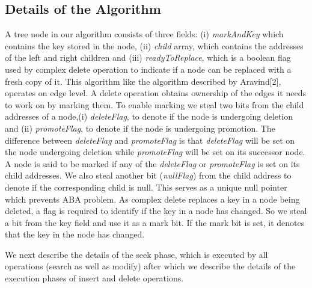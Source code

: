 \documentclass[11pt]{article}
\begin{document}
\begin{multicols}{2}
\subsection{Details of the Algorithm}
A tree node in our algorithm consists of three fields: (i) \textit{markAndKey} which contains the key stored in the node, (ii) \textit{child} array, which contains the addresses of the left and right children and (iii) \textit{readyToReplace}, which is a boolean flag used by complex delete operation to indicate if a node can be replaced with a fresh copy of it.
This algorithm like the algorithm described by Aravind[2], operates on edge level. A delete operation obtains ownership of the edges it needs to work on by marking them. To enable marking we steal two bits from the child addresses of a node,(i) \textit{deleteFlag}, to denote if the node is undergoing deletion and (ii) \textit{promoteFlag}, to denote if the node is undergoing promotion. The difference between \textit{deleteFlag} and \textit{promoteFlag} is that \textit{deleteFlag} will be set on the node undergoing deletion while \textit{promoteFlag} will be set on its successor node. A node is said to be marked if any of the \textit{deleteFlag} or \textit{promoteFlag} is set on its child addresses. We also steal another bit (\textit{nullFlag}) from the child address to denote if the corresponding child is null. This serves as a unique null pointer which prevents ABA problem. As complex delete replaces a key in a node being deleted, a flag is required to identify if the key in a node has changed. So we steal a bit from the key field and use it as a mark bit. If the mark bit is set, it denotes that the key in the node has changed.

We next describe the details of the seek phase, which is executed by all operations (search as well as modify) after which we describe the details of the execution phases of insert and delete operations.


\end{multicols}
\end{document}
